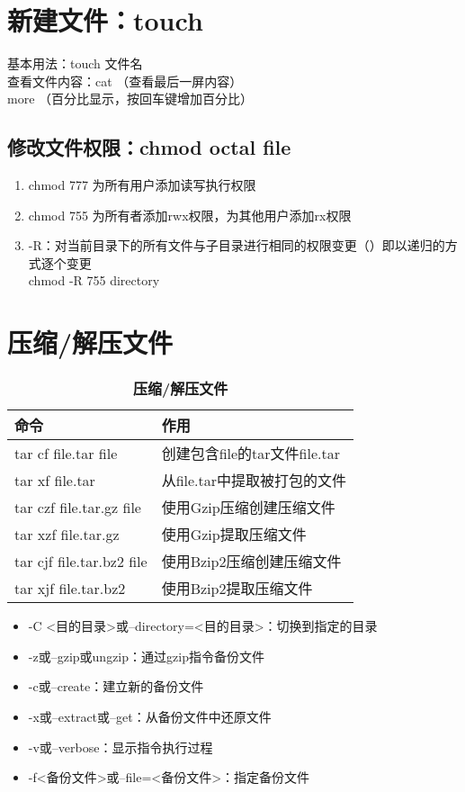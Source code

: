 \documentclass{notebook}
\begin{document}
\section{新建文件：touch}
基本用法：touch 文件名\\
查看文件内容：cat （查看最后一屏内容）\\
more （百分比显示，按回车键增加百分比）
\subsection{修改文件权限：chmod octal file}
\begin{enumerate}
    \item chmod 777 为所有用户添加读写执行权限
    \item chmod 755 为所有者添加rwx权限，为其他用户添加rx权限
    \item -R：对当前目录下的所有文件与子目录进行相同的权限变更（）即以递归的方式逐个变更\\
    chmod -R 755 directory
\end{enumerate}
\section{压缩/解压文件}
\begin{table}[htb]
    \centering
    \caption{\textbf{压缩/解压文件}}
    \begin{tabular}{l|l}
        \hline
        \hspace{3.5em}\textbf{命令}&\hspace{5em}\textbf{作用}\\
        \hline
        tar cf file.tar file&创建包含file的tar文件file.tar\\
        tar xf file.tar&从file.tar中提取被打包的文件\\
        tar czf file.tar.gz file&使用Gzip压缩创建压缩文件\\
        tar xzf file.tar.gz&使用Gzip提取压缩文件\\
        tar cjf file.tar.bz2 file&使用Bzip2压缩创建压缩文件\\
        tar xjf file.tar.bz2&使用Bzip2提取压缩文件\\
        \hline
    \end{tabular}
\end{table}
\begin{itemize}
    \item -C <目的目录>或--directory=<目的目录>：切换到指定的目录
    \item -z或--gzip或ungzip：通过gzip指令备份文件
    \item -c或--create：建立新的备份文件
    \item -x或--extract或--get：从备份文件中还原文件
    \item -v或--verbose：显示指令执行过程
    \item -f<备份文件>或--file=<备份文件>：指定备份文件
\end{itemize}
\end{document}
